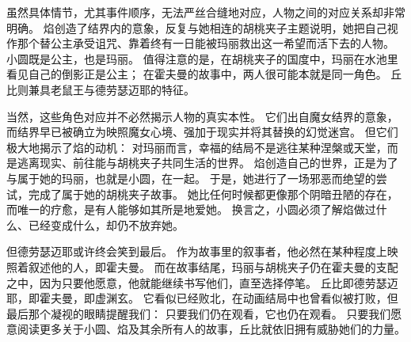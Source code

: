 虽然具体情节，尤其事件顺序，无法严丝合缝地对应，人物之间的对应关系却非常明确。
焰创造了结界内的意象，反复与她相连的胡桃夹子主题说明，她把自己视作那个替公主承受诅咒、靠着终有一日能被玛丽救出这一希望而活下去的人物。
小圆既是公主，也是玛丽。
值得注意的是，在胡桃夹子的国度中，玛丽在水池里看见自己的倒影正是公主；
在霍夫曼的故事中，两人很可能本就是同一角色。
丘比则兼具老鼠王与德劳瑟迈耶的特征。

当然，这些角色对应并不必然揭示人物的真实本性。
它们出自魔女结界的意象，而结界早已被确立为映照魔女心境、强加于现实并将其替换的幻觉迷宫。
但它们极大地揭示了焰的动机：
对玛丽而言，幸福的结局不是逃往某种涅槃或天堂，而是逃离现实、前往能与胡桃夹子共同生活的世界。
焰创造自己的世界，正是为了与属于她的玛丽，也就是小圆，在一起。
于是，她进行了一场邪恶而绝望的尝试，完成了属于她的胡桃夹子故事。
她比任何时候都更像那个阴暗丑陋的存在，而唯一的疗愈，是有人能够如其所是地爱她。
换言之，小圆必须了解焰做过什么、已经变成什么，却仍不放弃她。

但德劳瑟迈耶或许终会笑到最后。
作为故事里的叙事者，他必然在某种程度上映照着叙述他的人，即霍夫曼。
而在故事结尾，玛丽与胡桃夹子仍在霍夫曼的支配之中，因为只要他愿意，他就能继续书写他们，直至选择停笔。
丘比即德劳瑟迈耶，即霍夫曼，即虚渊玄。
它看似已经败北，在动画结局中也曾看似被打败，但最后那个凝视的眼睛提醒我们：
只要我们仍在观看，它也仍在观看。
只要我们愿意阅读更多关于小圆、焰及其余所有人的故事，丘比就依旧拥有威胁她们的力量。
